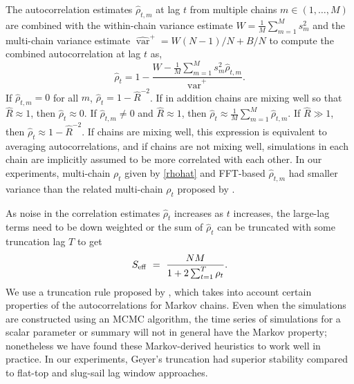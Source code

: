 \documentclass[american,]{article}
\DeclareMathOperator{\var}{var}
\theoremstyle{definition}
\begin{document}
The autocorrelation estimates \(\hat{\rho}_{t,m}\) at lag \(t\) from
multiple chains \(m \in (1,\ldots,M)\) are combined with the
within-chain variance estimate \(W= \frac{1}{M}\sum_{m=1}^{M}s_m^2\)
and the multi-chain variance estimate
\(\widehat{\var}^{+} = W(N-1)/N+B/N\) to compute the combined
autocorrelation at lag \(t\) as,
\begin{equation}
\hat{\rho}_t
= 1 - \frac{\displaystyle W - \textstyle \frac{1}{M} \sum_{m=1}^M
s_m^2 \hat{\rho}_{t,m}}{\widehat{\var}^{+}}. \label{rhohat}
\end{equation}
If $\hat{\rho}_{t,m}=0$ for all $m$, $\hat{\rho}_t=1-\widehat{R}^{-2}$.
If in addition chains are mixing well so that
$\widehat{R}\approx 1$, then $\hat{\rho}_t \approx 0$. If
$\hat{\rho}_{t,m} \neq 0$ and $\widehat{R} \approx 1$, then
$\hat{\rho}_t \approx \frac{1}{M} \sum_{m=1}^M \hat{\rho}_{t,m}$. If
$\widehat{R} \gg 1$, then $\hat{\rho}_t \approx 1-\widehat{R}^{-2}$.
If chains are mixing well, this expression is equivalent to averaging autocorrelations, and if
chains are not mixing well, simulations in each chain are implicitly assumed to be
more correlated with each other.
%
In our experiments, multi-chain $\rho_t$ given by \eqref{rhohat} and FFT-based $\hat{\rho}_{t,m}$ had smaller variance than the related
multi-chain $\rho_t$ proposed by \citet{BDA3}.

As noise in the correlation estimates \(\hat{\rho}_t\) increases as
\(t\) increases, the large-lag terms need to be down weighted
\citep[lag window approach, see,
e.g.][]{Geyer:1992,Flegal+Jones:2010} or the sum of
\(\hat{\rho}_t\) can be truncated with some truncation lag $T$ to get
\begin{equation}
S_{\rm eff} \ = \ \frac{NM}{1 + 2 \sum_{t = 1}^{T} \rho_t}.
\end{equation}
%
We use a truncation rule proposed by \citet{Geyer:1992}, which takes
into account certain properties of the autocorrelations for Markov
chains.  Even when the simulations are constructed using an MCMC
algorithm, the time series of simulations for a scalar parameter or
summary will not in general have the Markov property; nonetheless we
have found these Markov-derived heuristics to work well in practice.
In our experiments, Geyer's truncation had superior stability
compared to flat-top \citep[e.g.][]{Doss+etal:2014:MCMC-quantiles} and
slug-sail \citep{vats2018revisiting} lag window approaches.
\end{document}
